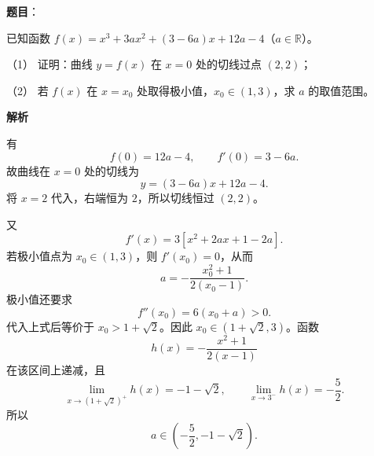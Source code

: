 \begin{answer}

\textbf{题目}：

已知函数 $f(x)=x^3+3ax^2+(3-6a)x+12a-4$（$a\in\mathbb R$）。

（1） 证明：曲线 $y=f(x)$ 在 $x=0$ 处的切线过点 $(2,2)$；

（2） 若 $f(x)$ 在 $x=x_0$ 处取得极小值，$x_0\in(1,3)$，求 $a$ 的取值范围。

\textbf{解析}


有
\nopagebreak[4]
\[
f(0)=12a-4,\qquad f'(0)=3-6a.
\]
故曲线在 $x=0$ 处的切线为
\nopagebreak[4]
\[
y=(3-6a)x+12a-4.
\]
将 $x=2$ 代入，右端恒为 $2$，所以切线恒过 $(2,2)$。


又
\nopagebreak[4]
\[
f'(x)=3\left[x^2+2ax+1-2a\right].
\]
若极小值点为 $x_0\in(1,3)$，则 $f'(x_0)=0$，从而
\nopagebreak[4]
\[
a=-\frac{x_0^2+1}{2(x_0-1)}.
\]
极小值还要求
\nopagebreak[4]
\[
f''(x_0)=6(x_0+a)>0.
\]
代入上式后等价于 $x_0>1+\sqrt2$。因此
$x_0\in(1+\sqrt2,3)$。函数
\nopagebreak[4]
\[
h(x)=-\frac{x^2+1}{2(x-1)}
\]
在该区间上递减，且
\nopagebreak[4]
\[
\lim_{x\to(1+\sqrt2)^+}h(x)=-1-\sqrt2,\qquad
\lim_{x\to3^-}h(x)=-\frac52.
\]
所以
\nopagebreak[4]
\[
a\in\left(-\frac52,-1-\sqrt2\right).
\]



\end{answer}

